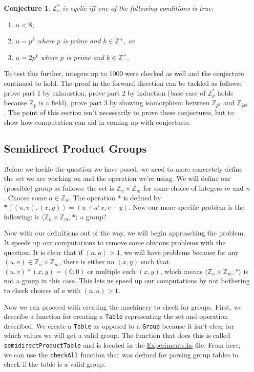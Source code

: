 \documentclass[11pt,a4paper]{article}
\newtheorem{conj}{Conjecture}
\theoremstyle{definition}
\begin{document}
\begin{conj}
$\mathbb{Z}_n^\ast$ is cyclic iff one of the following conditions is true:
\begin{enumerate}[label=\textbf{\alph*)}]
  \item $n < 8$,
  \item $n = p^k$ where $p$ is prime and $k \in \mathbb{Z}^+$, or
  \item $n = 2p^k$ where $p$ is prime and $k \in \mathbb{Z}^+$.
\end{enumerate}
\end{conj}

To test this further, integers up to 1000 were checked as well and the conjecture continued to hold. The proof in the forward direction can be tackled as follows: prove part 1 by exhaustion, prove part 2 by induction (base case of $\mathbb{Z}_p^\ast$ holds because $\mathbb{Z}_p$ is a field), prove part 3 by showing isomorphism between $\mathbb{Z}_{p^k}$ and $\mathbb{Z}_{2p^k}$. The point of this section isn't necessarily to prove these conjectures, but to show how computation can aid in coming up with conjectures.

\subsection{Semidirect Product Groups}

Before we tackle the question we have posed, we need to more concretely define the set we are working on and the operation we're using. We will define our (possible) group as follows: the set is $\mathbb{Z}_n \times \mathbb{Z}_m$ for some choice of integers $m$ and $n$. Choose some $a \in \mathbb{Z}_n$. The operation $\ast$ is defined by $\ast((u,v), (x,y)) = (u + a^vx, v + y)$. Now our more specific problem is the following: is $\langle \mathbb{Z}_n \times \mathbb{Z}_m, \ast \rangle$ a group?

Now with our definitions out of the way, we will begin approaching the problem. It speeds up our computations to remove some obvious problems with the question. It is clear that if $(n, a) > 1$, we will have problems because for any $(u, v) \in \mathbb{Z}_n \times \mathbb{Z}_m$, there is either no $(x, y)$ such that $(u, v) \ast (x, y) = (0, 0)$ or multiple such $(x, y)$, which means $\langle \mathbb{Z}_n \times \mathbb{Z}_m, \ast \rangle$ is not a group in this case. This lets us speed up our computations by not bothering to check choices of $a$ with $(n, a) > 1$.

Now we can proceed with creating the machinery to check for groups. First, we describe a function for creating a \texttt{Table} representing the set and operation described. We create a \texttt{Table} as opposed to a \texttt{Group} because it isn't clear for which values we will get a valid group. The function that does this is called \texttt{semidirectProductTable} and is located in the \href{https://github.com/gr-a-m/GrCal/blob/master/src/GrCal/Experiments.hs}{Experiments.hs} file. From here, we can use the \texttt{checkAll} function that was defined for parsing group tables to check if the table is a valid group.
\end{document}
